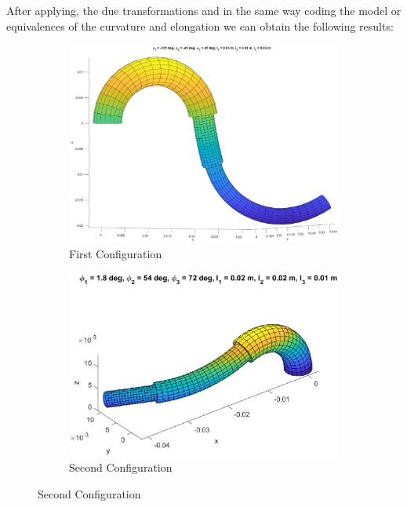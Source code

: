 \documentclass[12pt, twoside]{report}
\begin{document}
After applying, the due transformations and in the same way coding the model or equivalences of the curvature and elongation we can obtain the following results:\\
\begin{figure}[H]
     \centering
     \begin{subfigure}[b]{0.3\textwidth}
         \centering
         \includegraphics[width=\textwidth]{TP_1/sample6.eps}
         \caption{First Configuration}
         \label{figtube1}
     \end{subfigure}
     \hfill
     \begin{subfigure}[b]{0.3\textwidth}
         \centering
         \includegraphics[width=\textwidth]{TP_1/sample1.eps}
         \caption{Second Configuration}
         \label{fig:tube2}
     \end{subfigure}

\end{figure}
\end{document}
